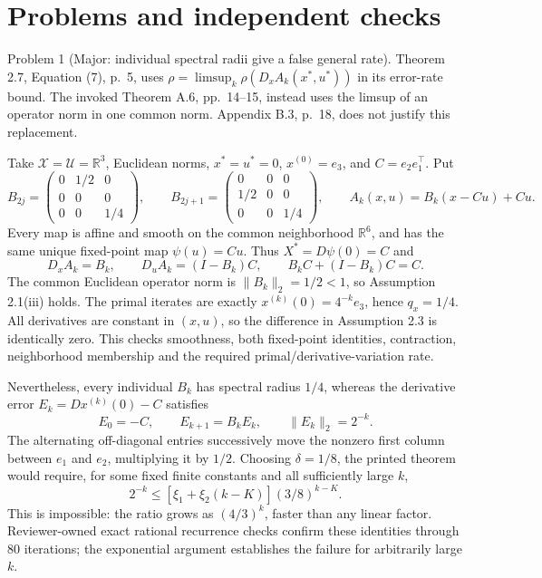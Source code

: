 \documentclass[10pt]{article}
\begin{document}
\section*{Problems and independent checks}
Problem 1 (Major: individual spectral radii give a false general rate).  Theorem 2.7, Equation (7), p. 5, uses \(\rho=\limsup_k\rho(D_xA_k(x^*,u^*))\) in its error-rate bound. The invoked Theorem A.6, pp. 14–15, instead uses the limsup of an operator norm in one common norm. Appendix B.3, p. 18, does not justify this replacement.\par
Take \(\mathcal X=\mathcal U=\mathbb R^3\), Euclidean norms, \(x^*=u^*=0\), \(x^{(0)}=e_3\), and \(C=e_2e_1^\top\). Put \[B_{2j}=\begin{pmatrix}0&1/2&0\\0&0&0\\0&0&1/4\end{pmatrix},
 \qquad
 B_{2j+1}=\begin{pmatrix}0&0&0\\1/2&0&0\\0&0&1/4\end{pmatrix},
 \qquad A_k(x,u)=B_k(x-Cu)+Cu .\] Every map is affine and smooth on the common neighborhood \(\mathbb R^6\), and has the same unique fixed-point map \(\psi(u)=Cu\). Thus \(X^*=D\psi(0)=C\) and \[D_xA_k=B_k,\qquad D_uA_k=(I-B_k)C,\qquad
 B_kC+(I-B_k)C=C.\] The common Euclidean operator norm is \(\|B_k\|_2=1/2<1\), so Assumption 2.1(iii) holds. The primal iterates are exactly \(x^{(k)}(0)=4^{-k}e_3\), hence \(q_x=1/4\). All derivatives are constant in \((x,u)\), so the difference in Assumption 2.3 is identically zero. This checks smoothness, both fixed-point identities, contraction, neighborhood membership and the required primal/derivative-variation rate.\par
Nevertheless, every individual \(B_k\) has spectral radius \(1/4\), whereas the derivative error \(E_k=D x^{(k)}(0)-C\) satisfies \[E_0=-C,\qquad E_{k+1}=B_kE_k,\qquad
 \|E_k\|_2=2^{-k}.\] The alternating off-diagonal entries successively move the nonzero first column between \(e_1\) and \(e_2\), multiplying it by \(1/2\). Choosing \(\delta=1/8\), the printed theorem would require, for some fixed finite constants and all sufficiently large \(k\), \[2^{-k}\le [\xi_1+\xi_2(k-K)](3/8)^{k-K}.\] This is impossible: the ratio grows as \((4/3)^k\), faster than any linear factor. Reviewer-owned exact rational recurrence checks confirm these identities through 80 iterations; the exponential argument establishes the failure for arbitrarily large \(k\).\par
\end{document}
